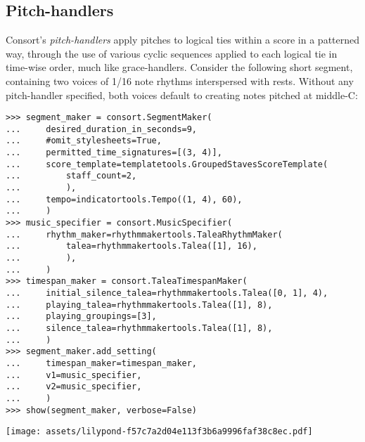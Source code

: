 \subsection{Pitch-handlers}
\label{ssec:pitch-handlers}

Consort's \emph{pitch-handlers} apply pitches to logical ties within a score in
a patterned way, through the use of various cyclic sequences applied to each
logical tie in time-wise order, much like grace-handlers. Consider the
following short segment, containing two voices of 1/16 note rhythms
interspersed with rests. Without any pitch-handler specified, both voices
default to creating notes pitched at middle-C:

\begin{comment}
<abjad>[stylesheet=../consort.ily]
segment_maker = consort.SegmentMaker(
    desired_duration_in_seconds=9,
    #omit_stylesheets=True,
    permitted_time_signatures=[(3, 4)],
    score_template=templatetools.GroupedStavesScoreTemplate(
        staff_count=2,
        ),
    tempo=indicatortools.Tempo((1, 4), 60),
    )
music_specifier = consort.MusicSpecifier(
    rhythm_maker=rhythmmakertools.TaleaRhythmMaker(
        talea=rhythmmakertools.Talea([1], 16),
        ),
    )
timespan_maker = consort.TaleaTimespanMaker(
    initial_silence_talea=rhythmmakertools.Talea([0, 1], 4),
    playing_talea=rhythmmakertools.Talea([1], 8),
    playing_groupings=[3],
    silence_talea=rhythmmakertools.Talea([1], 8),
    )
segment_maker.add_setting(
    timespan_maker=timespan_maker,
    v1=music_specifier,
    v2=music_specifier,
    )
show(segment_maker, verbose=False)
</abjad>
\end{comment}

\begin{abjadbookoutput}
\begin{singlespacing}
\vspace{-0.5\baselineskip}
\begin{verbatim}
>>> segment_maker = consort.SegmentMaker(
...     desired_duration_in_seconds=9,
...     #omit_stylesheets=True,
...     permitted_time_signatures=[(3, 4)],
...     score_template=templatetools.GroupedStavesScoreTemplate(
...         staff_count=2,
...         ),
...     tempo=indicatortools.Tempo((1, 4), 60),
...     )
>>> music_specifier = consort.MusicSpecifier(
...     rhythm_maker=rhythmmakertools.TaleaRhythmMaker(
...         talea=rhythmmakertools.Talea([1], 16),
...         ),
...     )
>>> timespan_maker = consort.TaleaTimespanMaker(
...     initial_silence_talea=rhythmmakertools.Talea([0, 1], 4),
...     playing_talea=rhythmmakertools.Talea([1], 8),
...     playing_groupings=[3],
...     silence_talea=rhythmmakertools.Talea([1], 8),
...     )
>>> segment_maker.add_setting(
...     timespan_maker=timespan_maker,
...     v1=music_specifier,
...     v2=music_specifier,
...     )
>>> show(segment_maker, verbose=False)
\end{verbatim}
\noindent\texttt{[image: assets/lilypond-f57c7a2d04e113f3b6a9996faf38c8ec.pdf]}
\end{singlespacing}
\end{abjadbookoutput}

